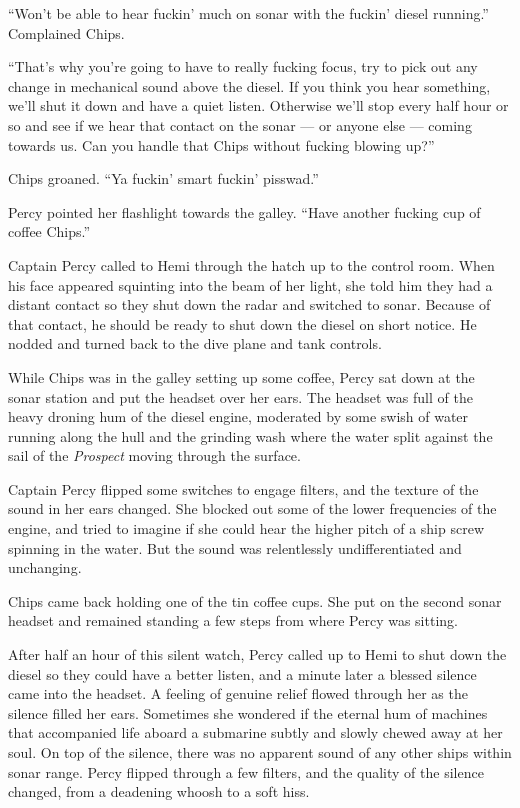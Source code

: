 \documentclass[
]{scrbook}
\begin{document}
``Won't be able to hear fuckin' much on sonar with the fuckin' diesel
running.'' Complained Chips.

``That's why you're going to have to really fucking focus, try to pick
out any change in mechanical sound above the diesel. If you think you
hear something, we'll shut it down and have a quiet listen. Otherwise
we'll stop every half hour or so and see if we hear that contact on the
sonar --- or anyone else --- coming towards us. Can you handle that
Chips without fucking blowing up?''

Chips groaned. ``Ya fuckin' smart fuckin' pisswad.''

Percy pointed her flashlight towards the galley. ``Have another fucking
cup of coffee Chips.''

Captain Percy called to Hemi through the hatch up to the control room.
When his face appeared squinting into the beam of her light, she told
him they had a distant contact so they shut down the radar and switched
to sonar. Because of that contact, he should be ready to shut down the
diesel on short notice. He nodded and turned back to the dive plane and
tank controls.

While Chips was in the galley setting up some coffee, Percy sat down at
the sonar station and put the headset over her ears. The headset was
full of the heavy droning hum of the diesel engine, moderated by some
swish of water running along the hull and the grinding wash where the
water split against the sail of the \emph{Prospect} moving through the
surface.

Captain Percy flipped some switches to engage filters, and the texture
of the sound in her ears changed. She blocked out some of the lower
frequencies of the engine, and tried to imagine if she could hear the
higher pitch of a ship screw spinning in the water. But the sound was
relentlessly undifferentiated and unchanging.

Chips came back holding one of the tin coffee cups. She put on the
second sonar headset and remained standing a few steps from where Percy
was sitting.

After half an hour of this silent watch, Percy called up to Hemi to shut
down the diesel so they could have a better listen, and a minute later a
blessed silence came into the headset. A feeling of genuine relief
flowed through her as the silence filled her ears. Sometimes she
wondered if the eternal hum of machines that accompanied life aboard a
submarine subtly and slowly chewed away at her soul. On top of the
silence, there was no apparent sound of any other ships within sonar
range. Percy flipped through a few filters, and the quality of the
silence changed, from a deadening whoosh to a soft hiss.
\end{document}
